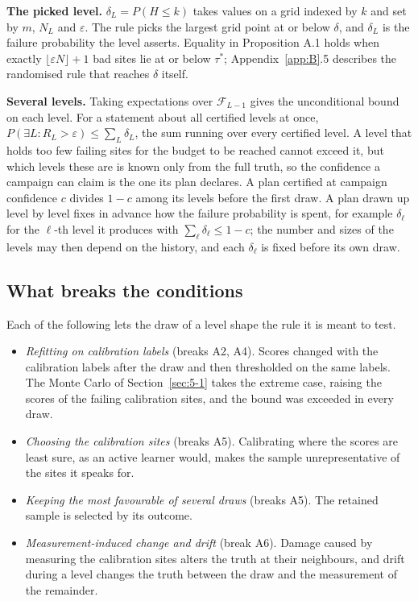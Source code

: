 \documentclass{iopjournal}
\providecommand{\tightlist}{\setlength{\itemsep}{0pt}\setlength{\parskip}{0pt}}
\begin{document}
\textbf{The picked level.} \(\delta_L = P(H \le k)\) takes values on a grid indexed by \(k\) and set by \(m\), \(N_L\) and \(\varepsilon\). The rule picks the largest grid point at or below \(\delta\), and \(\delta_L\) is the failure probability the level asserts. Equality in Proposition A.1 holds when exactly \(\lfloor \varepsilon N \rfloor + 1\) bad sites lie at or below \(\tau^\ast\); Appendix~\ref{app:B}.5 describes the randomised rule that reaches \(\delta\) itself.

\textbf{Several levels.} Taking expectations over \(\mathcal{F}_{L-1}\) gives the unconditional bound on each level. For a statement about all certified levels at once, \(P(\exists L : R_L > \varepsilon) \le \sum_L \delta_L\), the sum running over every certified level. A level that holds too few failing sites for the budget to be reached cannot exceed it, but which levels these are is known only from the full truth, so the confidence a campaign can claim is the one its plan declares. A plan certified at campaign confidence \(c\) divides \(1 - c\) among its levels before the first draw. A plan drawn up level by level fixes in advance how the failure probability is spent, for example \(\delta_\ell\) for the \(\ell\)-th level it produces with \(\sum_\ell \delta_\ell \le 1 - c\); the number and sizes of the levels may then depend on the history, and each \(\delta_\ell\) is fixed before its own draw.

\hypertarget{what-breaks-the-conditions}{%
\subsection{What breaks the conditions}\label{what-breaks-the-conditions}}

Each of the following lets the draw of a level shape the rule it is meant to test.

\begin{itemize}
\tightlist
\item
  \emph{Refitting on calibration labels} (breaks A2, A4). Scores changed with the calibration labels after the draw and then thresholded on the same labels. The Monte Carlo of Section~\ref{sec:5-1} takes the extreme case, raising the scores of the failing calibration sites, and the bound was exceeded in every draw.
\item
  \emph{Choosing the calibration sites} (breaks A5). Calibrating where the scores are least sure, as an active learner would, makes the sample unrepresentative of the sites it speaks for.
\item
  \emph{Keeping the most favourable of several draws} (breaks A5). The retained sample is selected by its outcome.
\item
  \emph{Measurement-induced change and drift} (break A6). Damage caused by measuring the calibration sites alters the truth at their neighbours, and drift during a level changes the truth between the draw and the measurement of the remainder.
\end{itemize}
\end{document}
